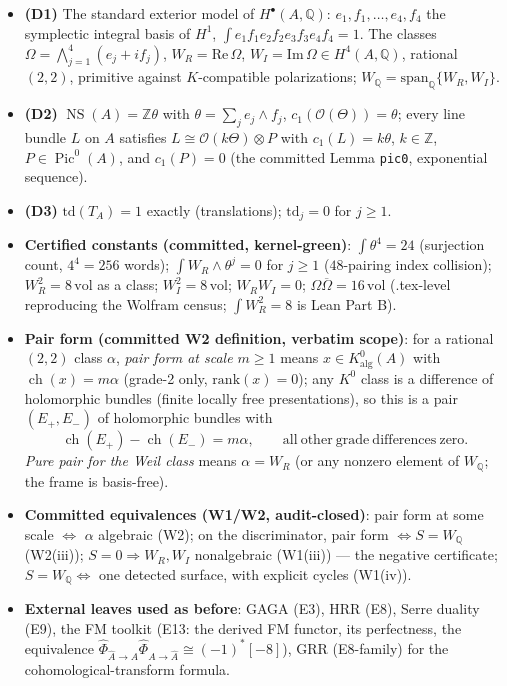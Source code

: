 \documentclass[11pt]{article}
\theoremstyle{definition}
\newcommand{\ch}{\operatorname{ch}}
\newcommand{\NS}{\operatorname{NS}}
\newcommand{\Pic}{\operatorname{Pic}}
\newcommand{\Q}{\mathbb{Q}}
\newcommand{\Z}{\mathbb{Z}}
\newcommand{\WQ}{W_{\Q}}
\newcommand{\vol}{\mathrm{vol}}
\newcommand{\FMc}{\widehat\Phi}
\begin{document}
\begin{itemize}
\item \textbf{(D1)} The standard exterior model of $H^\bullet(A,\Q)$:
$e_1,f_1,\dots,e_4,f_4$ the symplectic integral basis of $H^1$,
$\int e_1f_1e_2f_2e_3f_3e_4f_4=1$. The classes
$\Omega=\bigwedge_{j=1}^4(e_j+if_j)$, $W_R=\mathrm{Re}\,\Omega$,
$W_I=\mathrm{Im}\,\Omega\in H^4(A,\Q)$, rational $(2,2)$, primitive against
$K$-compatible polarizations; $\WQ=\mathrm{span}_\Q\{W_R,W_I\}$.
\item \textbf{(D2)} $\NS(A)=\Z\theta$ with $\theta=\sum_j e_j\wedge f_j$,
$c_1(\mathcal O(\Theta))=\theta$; every line bundle $L$ on $A$ satisfies
$L\cong\mathcal O(k\Theta)\otimes P$ with $c_1(L)=k\theta$, $k\in\Z$,
$P\in\Pic^0(A)$, and $c_1(P)=0$ (the committed Lemma \texttt{pic0},
exponential sequence).
\item \textbf{(D3)} $\mathrm{td}(T_A)=1$ exactly (translations);
$\mathrm{td}_j=0$ for $j\ge 1$.
\item \textbf{Certified constants (committed, kernel-green)}:
$\int\theta^4=24$ (surjection count, $4^4=256$ words);
$\int W_R\wedge\theta^j=0$ for $j\ge 1$ ($48$-pairing index collision);
$W_R^2=8\,\vol$ as a class; $W_I^2=8\,\vol$;
$W_RW_I=0$; $\Omega\overline\Omega=16\,\vol$
(.tex-level reproducing the Wolfram census;
$\int W_R^2=8$ is Lean Part B).
\item \textbf{Pair form (committed W2 definition, verbatim scope)}: for a
rational $(2,2)$ class $\alpha$, \emph{pair form at scale $m\ge 1$} means
$x\in K^0_{\mathrm{alg}}(A)$ with $\ch(x)=m\alpha$ (grade-2 only,
$\mathrm{rank}(x)=0$); any $K^0$ class is a difference of holomorphic
bundles (finite locally free presentations), so this is a pair
$(E_+,E_-)$ of holomorphic bundles with
\[
\ch(E_+)-\ch(E_-)=m\alpha,\qquad \mathrm{all\ other\ grade\ differences\ zero}.
\]
\emph{Pure pair for the Weil class} means $\alpha=W_R$ (or any nonzero
element of $\WQ$; the frame is basis-free).
\item \textbf{Committed equivalences (W1/W2, audit-closed)}:
pair form at some scale $\iff$ $\alpha$ algebraic (W2);
on the discriminator, pair form $\iff S=W_\Q$ (W2(iii));
$S=0\Rightarrow W_R,W_I$ nonalgebraic (W1(iii)) --- the negative certificate;
$S=W_\Q\iff$ one detected surface, with explicit cycles (W1(iv)).
\item \textbf{External leaves used as before}: GAGA (E3), HRR (E8),
Serre duality (E9), the FM toolkit (E13: the derived FM functor, its
perfectness, the equivalence $\FMc_{\widehat A\to A}\FMc_{A\to\widehat A}\cong(-1)^*[-8]$),
GRR (E8-family) for the cohomological-transform formula.
\end{itemize}
\end{document}
